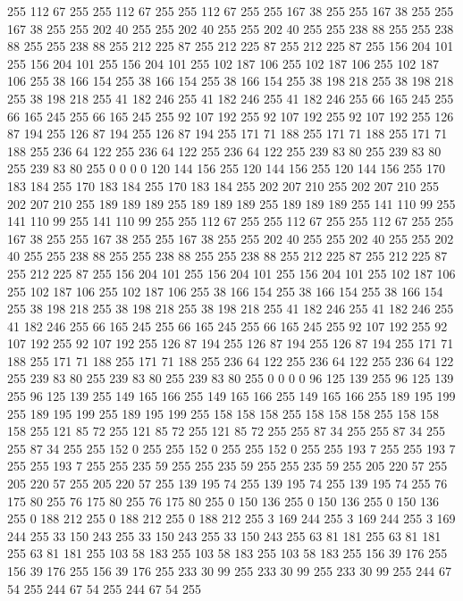 255 112 67 255 255 112 67 255 255 112 67 255 255 167 38 255 255 167 38 255 255 167 38 255 255 202 40 255 255 202 40 255 255 202 40 255 255 238 88 255 255 238 88 255 255 238 88 255 212 225 87 255 212 225 87 255 212 225 87 255 156 204 101 255
156 204 101 255 156 204 101 255 102 187 106 255 102 187 106 255 102 187 106 255 38 166 154 255 38 166 154 255 38 166 154 255 38 198 218 255 38 198 218 255 38 198 218 255 41 182 246 255 41 182 246 255 41 182 246 255 66 165 245 255 66 165 245 255
66 165 245 255 92 107 192 255 92 107 192 255 92 107 192 255 126 87 194 255 126 87 194 255 126 87 194 255 171 71 188 255 171 71 188 255 171 71 188 255 236 64 122 255 236 64 122 255 236 64 122 255 239 83 80 255 239 83 80 255 239 83 80 255
0 0 0 0 120 144 156 255 120 144 156 255 120 144 156 255 170 183 184 255 170 183 184 255 170 183 184 255 202 207 210 255 202 207 210 255 202 207 210 255 189 189 189 255 189 189 189 255 189 189 189 255 141 110 99 255 141 110 99 255 141 110 99 255
255 112 67 255 255 112 67 255 255 112 67 255 255 167 38 255 255 167 38 255 255 167 38 255 255 202 40 255 255 202 40 255 255 202 40 255 255 238 88 255 255 238 88 255 255 238 88 255 212 225 87 255 212 225 87 255 212 225 87 255 156 204 101 255
156 204 101 255 156 204 101 255 102 187 106 255 102 187 106 255 102 187 106 255 38 166 154 255 38 166 154 255 38 166 154 255 38 198 218 255 38 198 218 255 38 198 218 255 41 182 246 255 41 182 246 255 41 182 246 255 66 165 245 255 66 165 245 255
66 165 245 255 92 107 192 255 92 107 192 255 92 107 192 255 126 87 194 255 126 87 194 255 126 87 194 255 171 71 188 255 171 71 188 255 171 71 188 255 236 64 122 255 236 64 122 255 236 64 122 255 239 83 80 255 239 83 80 255 239 83 80 255
0 0 0 0 96 125 139 255 96 125 139 255 96 125 139 255 149 165 166 255 149 165 166 255 149 165 166 255 189 195 199 255 189 195 199 255 189 195 199 255 158 158 158 255 158 158 158 255 158 158 158 255 121 85 72 255 121 85 72 255 121 85 72 255
255 87 34 255 255 87 34 255 255 87 34 255 255 152 0 255 255 152 0 255 255 152 0 255 255 193 7 255 255 193 7 255 255 193 7 255 255 235 59 255 255 235 59 255 255 235 59 255 205 220 57 255 205 220 57 255 205 220 57 255 139 195 74 255
139 195 74 255 139 195 74 255 76 175 80 255 76 175 80 255 76 175 80 255 0 150 136 255 0 150 136 255 0 150 136 255 0 188 212 255 0 188 212 255 0 188 212 255 3 169 244 255 3 169 244 255 3 169 244 255 33 150 243 255 33 150 243 255
33 150 243 255 63 81 181 255 63 81 181 255 63 81 181 255 103 58 183 255 103 58 183 255 103 58 183 255 156 39 176 255 156 39 176 255 156 39 176 255 233 30 99 255 233 30 99 255 233 30 99 255 244 67 54 255 244 67 54 255 244 67 54 255
